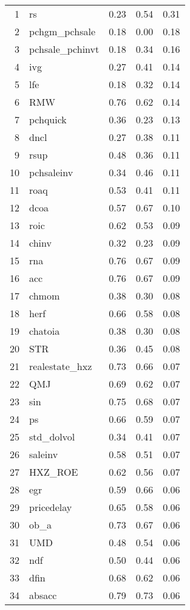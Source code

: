 \documentclass[12pt]{article}
\begin{document}
\begin{footnotesize}
\begin{longtable}{rl|c|c|c}
		
		1 & rs & 0.23 & 0.54 & 0.31 \\ 
		2 & pchgm\_pchsale & 0.18 & 0.00 & 0.18 \\ 
		3 & pchsale\_pchinvt & 0.18 & 0.34 & 0.16 \\ 
		4 & ivg & 0.27 & 0.41 & 0.14 \\ 
		5 & lfe & 0.18 & 0.32 & 0.14 \\ 
		6 & RMW & 0.76 & 0.62 & 0.14 \\ 
		7 & pchquick & 0.36 & 0.23 & 0.13 \\ 
		8 & dncl & 0.27 & 0.38 & 0.11 \\ 
		9 & rsup & 0.48 & 0.36 & 0.11 \\ 
		10 & pchsaleinv & 0.34 & 0.46 & 0.11 \\ 
		11 & roaq & 0.53 & 0.41 & 0.11 \\ 
		12 & dcoa & 0.57 & 0.67 & 0.10 \\ 
		13 & roic & 0.62 & 0.53 & 0.09 \\ 
		14 & chinv & 0.32 & 0.23 & 0.09 \\ 
		15 & rna & 0.76 & 0.67 & 0.09 \\ 
		16 & acc & 0.76 & 0.67 & 0.09 \\ 
		17 & chmom & 0.38 & 0.30 & 0.08 \\ 
		18 & herf & 0.66 & 0.58 & 0.08 \\ 
		19 & chatoia & 0.38 & 0.30 & 0.08 \\ 
		20 & STR & 0.36 & 0.45 & 0.08 \\ 
		21 & realestate\_hxz & 0.73 & 0.66 & 0.07 \\ 
		22 & QMJ & 0.69 & 0.62 & 0.07 \\ 
		23 & sin & 0.75 & 0.68 & 0.07 \\ 
		24 & ps & 0.66 & 0.59 & 0.07 \\ 
		25 & std\_dolvol & 0.34 & 0.41 & 0.07 \\ 
		26 & saleinv & 0.58 & 0.51 & 0.07 \\ 
		27 & HXZ\_ROE & 0.62 & 0.56 & 0.07 \\ 
		28 & egr & 0.59 & 0.66 & 0.06 \\ 
		29 & pricedelay & 0.65 & 0.58 & 0.06 \\ 
		30 & ob\_a & 0.73 & 0.67 & 0.06 \\ 
		31 & UMD & 0.48 & 0.54 & 0.06 \\ 
		32 & ndf & 0.50 & 0.44 & 0.06 \\ 
		33 & dfin & 0.68 & 0.62 & 0.06 \\ 
		34 & absacc & 0.79 & 0.73 & 0.06 \\ 

\end{longtable}
\end{footnotesize}
\end{document}
